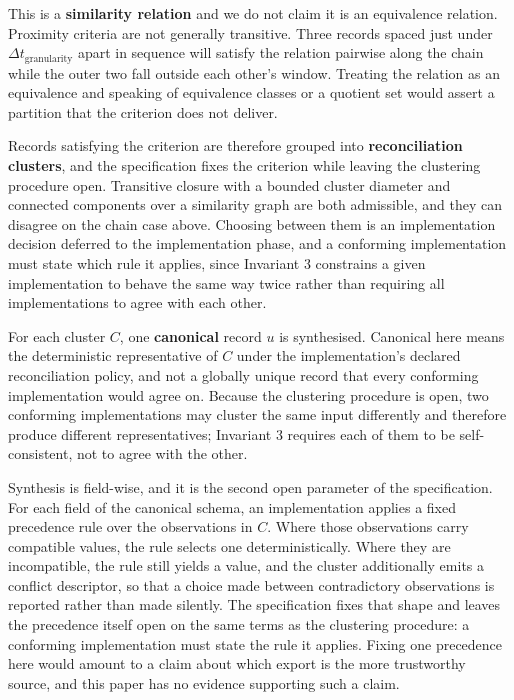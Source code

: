 This is a \textbf{similarity relation} and we do not claim it is an equivalence
relation. Proximity criteria are not generally transitive. Three records spaced
just under $\Delta t_{\text{granularity}}$ apart in sequence will satisfy the
relation pairwise along the chain while the outer two fall outside each other's
window. Treating the relation as an equivalence and speaking of equivalence
classes or a quotient set would assert a partition that the criterion does not
deliver.

Records satisfying the criterion are therefore grouped into
\textbf{reconciliation clusters}, and the specification fixes the criterion while
leaving the clustering procedure open. Transitive closure with a bounded cluster
diameter and connected components over a similarity graph are both admissible,
and they can disagree on the chain case above. Choosing between them is an
implementation decision deferred to the implementation phase, and a conforming
implementation must state which rule it applies, since Invariant 3 constrains a
given implementation to behave the same way twice rather than requiring all
implementations to agree with each other.

For each cluster $C$, one \textbf{canonical} record $u$ is synthesised. Canonical
here means the deterministic representative of $C$ under the implementation's
declared reconciliation policy, and not a globally unique record that every
conforming implementation would agree on. Because the clustering procedure is
open, two conforming implementations may cluster the same input differently and
therefore produce different representatives; Invariant 3 requires each of them
to be self-consistent, not to agree with the other.

Synthesis is field-wise, and it is the second open parameter of the
specification. For each field of the canonical schema, an implementation applies
a fixed precedence rule over the observations in $C$. Where those observations
carry compatible values, the rule selects one deterministically. Where they are
incompatible, the rule still yields a value, and the cluster additionally emits
a conflict descriptor, so that a choice made between contradictory observations
is reported rather than made silently. The specification fixes that shape and
leaves the precedence itself open on the same terms as the clustering procedure:
a conforming implementation must state the rule it applies. Fixing one
precedence here would amount to a claim about which export is the more
trustworthy source, and this paper has no evidence supporting such a claim.


